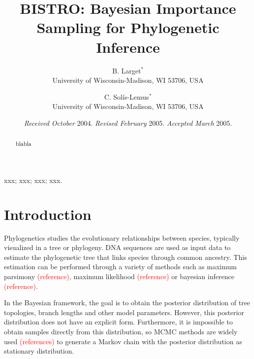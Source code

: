 \documentclass[useAMS,usenatbib]{biom}
\title[BISTRO]{BISTRO: Bayesian Importance Sampling for Phylogenetic Inference}
\author{B. Larget$^{*}$\email{bret.larget@wisc.edu} \\
	   University of Wisconsin-Madison, WI 53706, USA
	   \and 
	   C. Sol\'{i}s-Lemus$^{*}$\email{solislemus@wisc.edu}\\
	   University of Wisconsin-Madison, WI 53706, USA
	   }
\newcommand{\falta}[1]{\textcolor{red}{#1}}
\begin{document}
\date{{\it Received October} 2004. {\it Revised February} 2005.\newline 
{\it Accepted March} 2005.}

\pagerange{\pageref{firstpage}--\pageref{lastpage}} 



\label{firstpage}


\begin{abstract}
blabla
\end{abstract}

%
%

\begin{keywords}
xxx; xxx; xxx; xxx.
\end{keywords}

\maketitle

\section{Introduction}
\label{s:intro}

Phylogenetics studies the evolutionary relationships between species,
typically visualized in a tree or phylogeny. DNA sequences are used as
input data to estimate the phylogenetic tree that links species
through common ancestry. This estimation can be performed through a
variety of methods such as maximum parsimony \falta{(reference)},
maximum likelihood \falta{(reference)} or bayesian inference
\falta{(reference)}.

In the Bayesian framework, the goal is to obtain the posterior
distribution of tree topologies, branch lengths and other model
parameters. However, this posterior distribution does not have an
explicit form. Furthermore, it is impossible to obtain samples
directly from this distribution, so MCMC methods are widely used
\falta{(references)} to generate a Markov chain with the posterior
distribution as stationary distribution.
\end{document}
